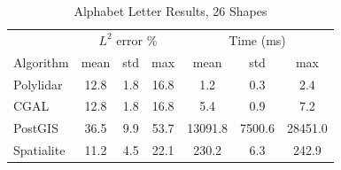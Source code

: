 
 
\begin{table}[!ht]
\centering
\caption{Alphabet Letter Results, 26 Shapes}
\label{table:ch2_alphabet_tests}
\begin{tabular}{lcccccc}
\toprule
{} & \multicolumn{3}{c}{$L^2$ error \%} & \multicolumn{3}{c}{Time (ms)} \\
{Algorithm} &    mean & std &  max &      mean &     std &     max \\
\midrule
Polylidar  &           12.8 & 1.8 & 16.8 &       1.2 &    0.3 &     2.4 \\
CGAL       &           12.8 & 1.8 & 16.8 &       5.4 &    0.9 &     7.2 \\
PostGIS    &           36.5 & 9.9 & 53.7 &   13091.8 & 7500.6 & 28451.0 \\
Spatialite &           11.2 & 4.5 & 22.1 &     230.2 &    6.3 &   242.9 \\
\bottomrule
\end{tabular}
\end{table}

